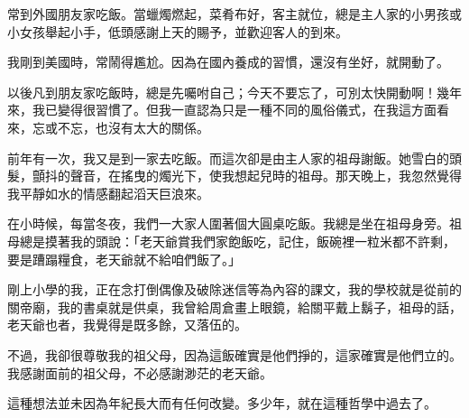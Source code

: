 
\begin{acknowledgement}

常到外國朋友家吃飯。當蠟燭燃起，菜肴布好，客主就位，總是主人家的小男孩或小女孩舉起小手，低頭感謝上天的賜予，並歡迎客人的到來。

我剛到美國時，常鬧得尷尬。因為在國內養成的習慣，還沒有坐好，就開動了。

以後凡到朋友家吃飯時，總是先囑咐自己；今天不要忘了，可別太快開動啊！幾年來，我已變得很習慣了。但我一直認為只是一種不同的風俗儀式，在我這方面看來，忘或不忘，也沒有太大的關係。

前年有一次，我又是到一家去吃飯。而這次卻是由主人家的祖母謝飯。她雪白的頭髮，顫抖的聲音，在搖曳的燭光下，使我想起兒時的祖母。那天晚上，我忽然覺得我平靜如水的情感翻起滔天巨浪來。

在小時候，每當冬夜，我們一大家人圍著個大圓桌吃飯。我總是坐在祖母身旁。祖母總是摸著我的頭說：「老天爺賞我們家飽飯吃，記住，飯碗裡一粒米都不許剩，要是蹧蹋糧食，老天爺就不給咱們飯了。」

剛上小學的我，正在念打倒偶像及破除迷信等為內容的課文，我的學校就是從前的關帝廟，我的書桌就是供桌，我曾給周倉畫上眼鏡，給關平戴上鬍子，祖母的話，老天爺也者，我覺得是既多餘，又落伍的。

不過，我卻很尊敬我的祖父母，因為這飯確實是他們掙的，這家確實是他們立的。我感謝面前的祖父母，不必感謝渺茫的老天爺。

這種想法並未因為年紀長大而有任何改變。多少年，就在這種哲學中過去了。

\end{acknowledgement}